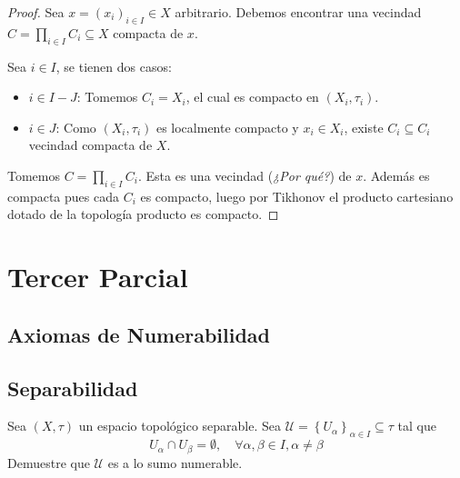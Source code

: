 \documentclass[12pt]{report}
\theoremstyle{largebreak}
\begin{document}
    \begin{proof}
        Sea $x=\left( x_i\right)_{ i\in I} \in X$ arbitrario. Debemos encontrar una vecindad $C=\prod_{i\in I}C_i \subseteq X$ compacta de $x$.
        
        Sea $i\in I$, se tienen dos casos:
        \begin{itemize}
            \item $i\in I-J$: Tomemos $C_i=X_i$, el cual es compacto en $(X_i,\tau_i)$.
            \item $i\in J$: Como $(X_i,\tau_i)$ es localmente compacto y $x_i\in X_i$, existe $C_i\subseteq C_i$ vecindad compacta de $X$.
        \end{itemize}
        Tomemos $C=\prod_{ i\in I}C_i$. Esta es una vecindad (\textit{¿Por qué?}) de $x$. Además es compacta pues cada $C_i$ es compacto, luego por Tikhonov el producto cartesiano dotado de la topología producto es compacto.
    \end{proof}

    \chapter{Tercer Parcial}

    \section{Axiomas de Numerabilidad}

    \section{Separabilidad}

    \begin{excer}
        Sea $(X,\tau)$ un espacio topológico separable. Sea $\mathcal{U}=\left\{U_\alpha \right\}_{\alpha\in I}\subseteq\tau$ tal que
        \begin{equation*}
            U_\alpha\cap U_\beta=\emptyset,\quad\forall \alpha,\beta\in I,\alpha\neq\beta
        \end{equation*}
        Demuestre que $\mathcal{U}$ es a lo sumo numerable.
    \end{excer}
\end{document}
